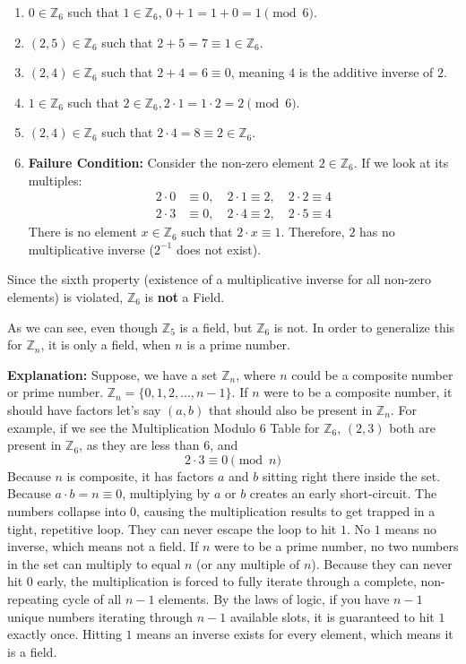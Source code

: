 \documentclass[11pt, a4paper]{article}
\begin{document}
	\begin{enumerate}
		\item $0 \in \mathbb{Z}_6$ such that $1 \in \mathbb{Z}_6$, $0 + 1 = 1 + 0 = 1 \pmod 6$. 
		\item $(2,5) \in \mathbb{Z}_6$ such that $2 + 5 = 7 \equiv 1 \in \mathbb{Z}_6$.
		\item $(2, 4) \in \mathbb{Z}_6$ such that $2 + 4 = 6 \equiv 0$, meaning $4$ is the additive inverse of $2$.
		\item $1 \in \mathbb{Z}_6$ such that $2 \in \mathbb{Z}_6, 2 \cdot 1 = 1 \cdot 2 = 2 \pmod 6$.
		\item $(2,4) \in \mathbb{Z}_6$ such that $2 \cdot 4 = 8 \equiv 2 \in \mathbb{Z}_6$.
		\item \textbf{Failure Condition:} Consider the non-zero element $2 \in \mathbb{Z}_6$. If we look at its multiples:
		\begin{align*}
			2 \cdot 0 &\equiv 0, \quad 2 \cdot 1 \equiv 2, \quad 2 \cdot 2 \equiv 4 \\
			2 \cdot 3 &\equiv 0, \quad 2 \cdot 4 \equiv 2, \quad 2 \cdot 5 \equiv 4
		\end{align*}
		There is no element $x \in \mathbb{Z}_6$ such that $2 \cdot x \equiv 1$. Therefore, $2$ has no multiplicative inverse ($2^{-1}$ does not exist).
	\end{enumerate}
	Since the sixth property (existence of a multiplicative inverse for all non-zero elements) is violated, $\mathbb{Z}_6$ is \textbf{not} a Field.\newline
	
	\noindent As we can see, even though $\mathbb{Z}_5$ is a field, but $\mathbb{Z}_6$ is not. In order to generalize this for $\mathbb{Z}_n$, it is only a field, when $n$ is a prime number.\newline
	
	\noindent \textbf{Explanation:} Suppose, we have a set $\mathbb{Z}_n$, where $n$ could be a composite number or prime number. $\mathbb{Z}_n = \{0, 1, 2, ..., n-1\}$. If $n$ were to be a composite number, it should have factors let's say $(a, b)$ that should also be present in $\mathbb{Z}_n$. For example, if we see the Multiplication Modulo 6 Table for $\mathbb{Z}_6$, $(2, 3)$ both are present in $\mathbb{Z}_6$, as they are less than $6$, and \[
	2 \cdot 3 \equiv 0 \pmod{n}
	\]
	Because $n$ is composite, it has factors $a$ and $b$ sitting right there inside the set. Because $a \cdot b = n \equiv 0$, multiplying by $a$ or $b$ creates an early short-circuit. The numbers collapse into $0$, causing the multiplication results to get trapped in a tight, repetitive loop. They can never escape the loop to hit $1$. No $1$ means no inverse, which means not a field. \newline 
	\newline If $n$ were to be a prime number, no two numbers in the set can multiply to equal $n$ (or any multiple of $n$). Because they can never hit $0$ early, the multiplication is forced to fully iterate through a complete, non-repeating cycle of all $n-1$ elements. By the laws of logic, if you have $n-1$ unique numbers iterating through $n-1$ available slots, it is guaranteed to hit $1$ exactly once. Hitting $1$ means an inverse exists for every element, which means it is a field.
	
\end{document}
